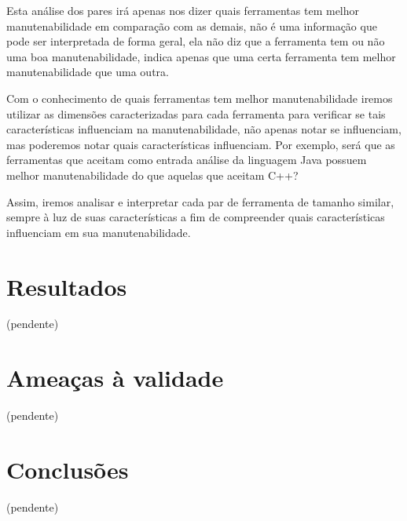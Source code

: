 Esta análise dos pares irá apenas nos dizer quais ferramentas tem melhor
manutenabilidade em comparação com as demais, não é uma informação que
pode ser interpretada de forma geral, ela não diz que a ferramenta tem
ou não uma boa manutenabilidade, indica apenas que uma certa ferramenta
tem melhor manutenabilidade que uma outra.

Com o conhecimento de quais ferramentas tem melhor manutenabilidade iremos
utilizar as dimensões caracterizadas para cada ferramenta para verificar se
tais características influenciam na manutenabilidade, não apenas notar se
influenciam, mas poderemos notar quais características influenciam. Por
exemplo, será que as ferramentas que aceitam como entrada análise da linguagem
Java possuem melhor manutenabilidade do que aquelas que aceitam C++?

Assim, iremos analisar e interpretar cada par de ferramenta de tamanho
similar, sempre à luz de suas características a fim de compreender quais
características influenciam em sua manutenabilidade.

\section{Resultados}

(pendente)

\section{Ameaças à validade}

(pendente)

\section{Conclusões}

(pendente)

